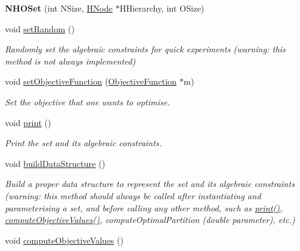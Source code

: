 \begin{DoxyCompactItemize}
\item 
\hypertarget{classNHOSet_a742973945209773c1e9011f8637fe05b}{{\bfseries N\-H\-O\-Set} (int N\-Size, \hyperlink{classHNode}{H\-Node} $\ast$H\-Hierarchy, int O\-Size)}\label{classNHOSet_a742973945209773c1e9011f8637fe05b}

\item 
\hypertarget{classNHOSet_ae73a4b22551df422392087730c9c26fd}{void \hyperlink{classNHOSet_ae73a4b22551df422392087730c9c26fd}{set\-Random} ()}\label{classNHOSet_ae73a4b22551df422392087730c9c26fd}

\begin{DoxyCompactList}\small\item\em Randomly set the algebraic constraints for quick experiments (warning\-: this method is not always implemented) \end{DoxyCompactList}\item 
void \hyperlink{classNHOSet_ac1e59897d3af9dd6c019d6db9bb74dd1}{set\-Objective\-Function} (\hyperlink{classObjectiveFunction}{Objective\-Function} $\ast$m)
\begin{DoxyCompactList}\small\item\em Set the objective that one wants to optimise. \end{DoxyCompactList}\item 
\hypertarget{classNHOSet_ad4e76f5034d84cb5c43c6df373113187}{void \hyperlink{classNHOSet_ad4e76f5034d84cb5c43c6df373113187}{print} ()}\label{classNHOSet_ad4e76f5034d84cb5c43c6df373113187}

\begin{DoxyCompactList}\small\item\em Print the set and its algebraic constraints. \end{DoxyCompactList}\item 
\hypertarget{classNHOSet_a97466bc5172f0e509f6a311a57b2e68c}{void \hyperlink{classNHOSet_a97466bc5172f0e509f6a311a57b2e68c}{build\-Data\-Structure} ()}\label{classNHOSet_a97466bc5172f0e509f6a311a57b2e68c}

\begin{DoxyCompactList}\small\item\em Build a proper data structure to represent the set and its algebraic constraints (warning\-: this method should always be called after instantiating and parameterising a set, and before calling any other method, such as \hyperlink{classNHOSet_ad4e76f5034d84cb5c43c6df373113187}{print()}, \hyperlink{classNHOSet_a8f1438a5867b733f2788536609fbe18f}{compute\-Objective\-Values()}, compute\-Optimal\-Partition (double parameter), etc.) \end{DoxyCompactList}\item 
\hypertarget{classNHOSet_a8f1438a5867b733f2788536609fbe18f}{void \hyperlink{classNHOSet_a8f1438a5867b733f2788536609fbe18f}{compute\-Objective\-Values} ()}\label{classNHOSet_a8f1438a5867b733f2788536609fbe18f}


\end{DoxyCompactItemize}
